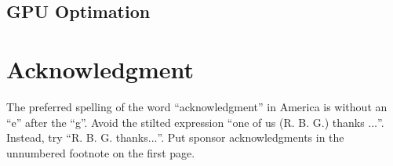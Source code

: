 \documentclass[conference]{IEEEtran}
\begin{document}
    \subsection{GPU Optimation}



\section*{Acknowledgment}

The preferred spelling of the word ``acknowledgment'' in America is without 
an ``e'' after the ``g''. Avoid the stilted expression ``one of us (R. B. 
G.) thanks $\ldots$''. Instead, try ``R. B. G. thanks$\ldots$''. Put sponsor 
acknowledgments in the unnumbered footnote on the first page.



\end{document}
